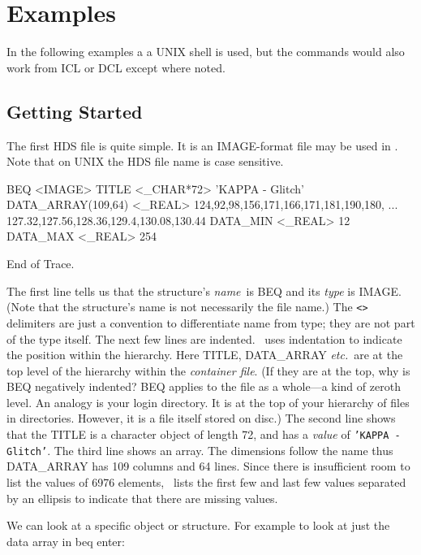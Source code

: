 \documentclass[11pt,nolof]{starlink}
\begin{document}
\section{Examples}
\label{se:example}
In the following examples a a UNIX shell is used, but the commands would
also work from ICL or DCL except where noted.

\subsection{Getting Started}
The first HDS file is quite simple.  It is an IMAGE-format file may be
used in \KAPPA.  Note that on UNIX the HDS file name
is case sensitive.

\small
\begin{terminalv}

BEQ  <IMAGE>
  TITLE          <_CHAR*72>      'KAPPA - Glitch'
  DATA_ARRAY(109,64)  <_REAL>    124,92,98,156,171,166,171,181,190,180,
                                 ... 127.32,127.56,128.36,129.4,130.08,130.44
  DATA_MIN       <_REAL>         12
  DATA_MAX       <_REAL>         254

End of Trace.
\end{terminalv}
\normalsize
The first line tells us that the structure's \emph{name}\ is BEQ and its
\emph{type\/} is IMAGE.  (Note that the structure's name is not
necessarily the file name.)  The \texttt{<>} delimiters are just a
convention to differentiate name from type; they are not part of the
type itself.  The next few lines are indented.  \HDSTRACE\
uses indentation to indicate the position within the hierarchy.  Here
TITLE, DATA\_ARRAY \emph{etc.}\ are at the top level of the hierarchy
within the \emph{container file}.  (If they are at the top, why is BEQ
negatively indented?  BEQ applies to the file as a whole---a kind of
zeroth level. An analogy is your login directory.  It is at the top of
your hierarchy of files in directories.  However, it is a file itself
stored on disc.) The second line shows that the TITLE is a character
object of length 72, and has a \emph{value\/} of \texttt{'KAPPA - Glitch'}.
The third line shows an array.  The dimensions follow the name thus
DATA\_ARRAY has 109 columns and 64 lines.  Since there is insufficient
room to list the values of 6976 elements, \HDSTRACE\ lists
the first few and last few values separated by an ellipsis to indicate
that there are missing values.

We can look at a specific object or structure.  For example to look
at just the data array in beq enter:
\end{document}
